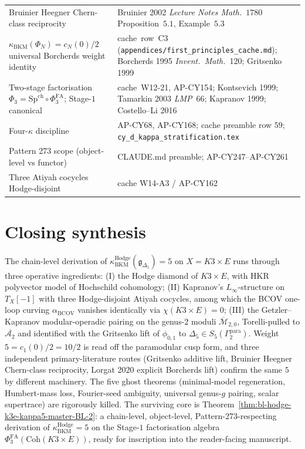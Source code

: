 \documentclass[11pt]{article}
\providecommand{\BCOV}{\mathrm{BCOV}}
\providecommand{\Coh}{\mathrm{Coh}}
\providecommand{\cA}{\mathcal{A}}
\providecommand{\fg}{\mathfrak{g}}
\providecommand{\kBKM}{\kappa_{\mathrm{BKM}}}
\providecommand{\kHodge}{\kappa_{\mathrm{BKM}}^{\mathrm{Hodge}}}
\providecommand{\Mbar}{\overline{\mathcal M}}
\providecommand{\SpCh}{\mathrm{Sp}^{\mathrm{ch}}}
\providecommand{\PhiFA}{\Phi^{\mathrm{FA}}}
\begin{document}
\begin{center}
\begin{tabular}{p{}p{}}
Bruinier Heegner Chern-class reciprocity &
Bruinier 2002 \emph{Lecture Notes Math.}~$1780$ Proposition~$5.1$,
Example~$5.3$ \\
$\kBKM(\Phi_N) = c_N(0)/2$ universal Borcherds weight identity &
cache~row~C3 (\texttt{appendices/first\_principles\_cache.md});
Borcherds 1995 \emph{Invent.\ Math.}~120; Gritsenko 1999 \\
Two-stage factorisation $\Phi_3 = \SpCh \circ \PhiFA_3$; Stage-$1$ canonical &
cache~W12-21, AP-CY154; Kontsevich 1999; Tamarkin 2003 \emph{LMP}~66;
Kapranov 1999; Costello--Li 2016 \\
Four-$\kappa$ discipline &
AP-CY68, AP-CY168; cache preamble row $59$; \texttt{cy\_d\_kappa\_stratification.tex} \\
Pattern 273 scope (object-level vs functor) &
CLAUDE.md preamble; AP-CY247--AP-CY261 \\
Three Atiyah cocycles Hodge-disjoint &
cache W14-A3 / AP-CY162 \\
\end{tabular}
\end{center}

\section{Closing synthesis}
\label{sec:closing}

The chain-level derivation of $\kHodge(\fg_{\Delta_5}) = 5$ on
$X = K3 \times E$ runs through three operative ingredients:
(I) the Hodge diamond of $K3 \times E$, with HKR polyvector model of
Hochschild cohomology; (II) Kapranov's $L_\infty$-structure on
$T_X[-1]$ with three Hodge-disjoint Atiyah cocycles, among which the
BCOV one-loop curving $\alpha_\BCOV$ vanishes identically via
$\chi(K3 \times E) = 0$; (III) the Getzler--Kapranov modular-operadic
pairing on the genus-$2$ moduli $\Mbar_{2, 0}$, Torelli-pulled to
$\overline{\cA_2}$ and identified with the Gritsenko lift of $\phi_{0, 1}$
to $\Delta_5 \in S_5(\Gamma_2^{\mathrm{para}})$. Weight $5 = c_1(0)/2
= 10/2$ is read off the paramodular cusp form, and three independent
primary-literature routes (Gritsenko additive lift, Bruinier Heegner
Chern-class reciprocity, Lorgat 2020 explicit Borcherds lift) confirm
the same $5$ by different machinery. The five ghost theorems
(minimal-model regeneration, Humbert-mass loss, Fourier-seed ambiguity,
universal genus-$g$ pairing, scalar supertrace) are rigorously killed.
The surviving core is Theorem~\ref{thm:bl-hodge-k3e-kappa5-master-BL-2}:
a chain-level, object-level, Pattern-273-respecting derivation of
$\kHodge = 5$ on the Stage-$1$ factorisation algebra $\PhiFA_3(\Coh(K3 \times E))$,
ready for inscription into the reader-facing manuscript.
\end{document}
